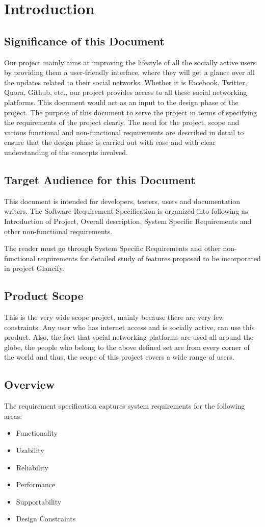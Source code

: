 \documentclass[12pt]{article}
\begin{document}
\section{Introduction}
\subsection{Significance of this Document}
Our project mainly aims at improving the lifestyle of all the socially active
users by providing them a user-friendly interface, where they will get a
glance over all the updates related to their social networks. Whether it is
Facebook, Twitter, Quora, Github, etc., our project provides access to all
these social networking platforms.
This document would act as an input to the design phase of the project.
The purpose of this document to serve the project in terms of specifying
the requirements of the project clearly. The need for the project, scope
and various functional and non-functional requirements are described in
detail to ensure that the design phase is carried out with ease and with
clear understanding of the concepts involved.

\subsection{Target Audience for this Document}
This document is intended for developers, testers, users and documentation writers. The Software Requirement Specification is organized into following as Introduction of Project, Overall description, System Specific Requirements and other non-functional requirements.
\par
The reader must go through System Specific Requirements and other non-functional requirements for detailed study of features proposed to be incorporated in project Glancify.

\subsection{Product Scope}
This is the very wide scope project, mainly because there are very few
constraints. Any user who has internet access and is socially active, can
use this product. Also, the fact that social networking platforms are used
all around the globe, the people who belong to the above defined set are
from every corner of the world and thus, the scope of this project covers
a wide range of users.

\subsection{Overview}
The requirement specification captures system requirements for the
following areas:
\begin{itemize}
    \item Functionality
    \item Usability
    \item Reliability
    \item Performance
    \item Supportability
    \item Design Constraints
 
\end{itemize}
\end{document}
